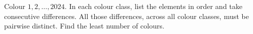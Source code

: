 Colour $1,2,\ldots,2024$. In each colour class, list the elements in order and take consecutive differences. All those differences, across all colour classes, must be pairwise distinct. Find the least number of colours.
